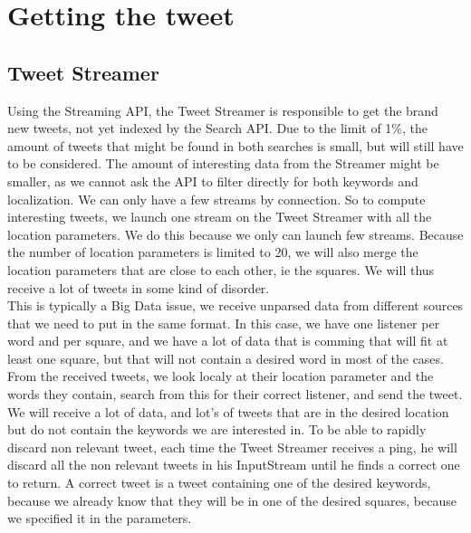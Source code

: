 \section{Getting the tweet}
\subsection{Tweet Streamer}
Using the Streaming API, the Tweet Streamer is responsible to get the brand new tweets, not yet indexed by the Search API. Due to the limit of 1\%, the amount of tweets that might be found in both searches is small, but will still have to be considered. The amount of interesting data from the Streamer might be smaller, as we cannot ask the API to filter directly for both keywords and localization. We can only have a few streams by connection. So to compute interesting tweets, we launch one stream on the Tweet Streamer with all the location parameters. We do this because we only can launch few streams. Because the number of location parameters is limited to 20, we will also merge the location parameters that are close to each other, ie the squares. We will thus receive a lot of tweets in some kind of disorder. \\
This is typically a Big Data issue, we receive unparsed data from different sources that we need to put in the same format. In this case, we have one listener per word and per square, and we have a lot of data that is comming that will fit at least one square, but that will not contain a desired word in most of the cases.\\
From the received tweets, we look localy at their location parameter and the words they contain, search from this for their correct listener, and send the tweet. We will receive a lot of data, and lot's of tweets that are in the desired location but do not contain the keywords we are interested in. To be able to rapidly discard non relevant tweet, each time the Tweet Streamer receives a ping, he will discard all the non relevant tweets in his InputStream until he finds a correct one to return. A correct tweet is a tweet containing one of the desired keywords, because we already know that they will be in one of the desired squares, because we specified it in the parameters.
